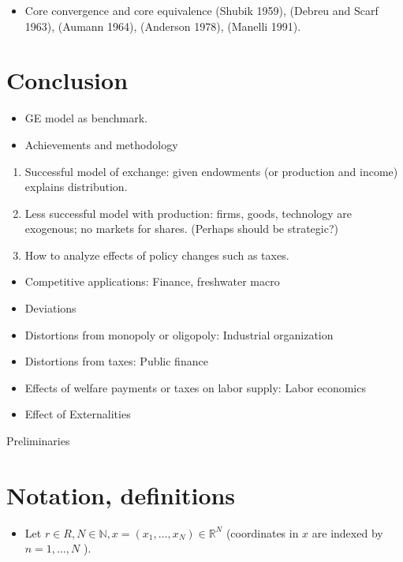 \documentclass[10pt]{article}
\begin{document}
\begin{itemize}
  \item Core convergence and core equivalence (Shubik 1959), (Debreu and Scarf 1963), (Aumann 1964), (Anderson 1978), (Manelli 1991).
\end{itemize}

\section*{Conclusion}
\begin{itemize}
  \item GE model as benchmark.
  \item Achievements and methodology
\end{itemize}

\begin{enumerate}
  \item Successful model of exchange: given endowments (or production and income) explains distribution.
  \item Less successful model with production: firms, goods, technology are exogenous; no markets for shares. (Perhaps should be strategic?)
  \item How to analyze effects of policy changes such as taxes.
\end{enumerate}

\begin{itemize}
  \item Competitive applications: Finance, freshwater macro
  \item Deviations
  \item Distortions from monopoly or oligopoly: Industrial organization
  \item Distortions from taxes: Public finance
  \item Effects of welfare payments or taxes on labor supply: Labor economics
  \item Effect of Externalities
\end{itemize}

Preliminaries

\section*{Notation, definitions}
\begin{itemize}
  \item Let $r \in R, N \in \mathbb{N}, x=\left(x_{1}, \ldots, x_{N}\right) \in \mathbb{R}^{N}$ (coordinates in $x$ are indexed by $n=1, \ldots, N$ ).
\end{itemize}
\end{document}
